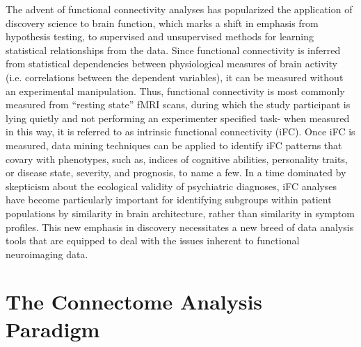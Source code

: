 The advent of functional connectivity analyses has popularized the application of discovery science to brain function, which marks a shift in emphasis from hypothesis testing, to supervised and unsupervised methods for learning statistical relationships from the data\cite{Biswal2010}. Since functional connectivity is inferred from statistical dependencies between physiological measures of brain activity (i.e. correlations between the dependent variables), it can be measured without an experimental manipulation. Thus, functional connectivity is most commonly measured from ``resting state'' fMRI scans, during which the study participant is lying quietly and not performing an experimenter specified task- when measured in this way, it is referred to as intrinsic functional connectivity (iFC)\cite{Biswal1995}. Once iFC is measured, data mining techniques can be applied to identify iFC patterns that covary with phenotypes, such as, indices of cognitive abilities, personality traits, or disease state, severity, and prognosis, to name a few\cite{Varoquaux2013}. In a time dominated by skepticism about the ecological validity of psychiatric diagnoses\cite{Kapur2012}, iFC analyses have become particularly important for identifying subgroups within patient populations by similarity in brain architecture, rather than similarity in symptom profiles. This new emphasis in discovery necessitates a new breed of data analysis tools that are equipped to deal with the issues inherent to functional neuroimaging data.

\section{The Connectome Analysis Paradigm}

